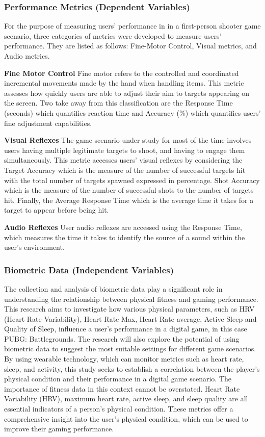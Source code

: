 \subsubsection{Performance Metrics (Dependent Variables)}
For the purpose of measuring users' performance in in a first-person shooter game scenario, three categories of metrics were
developed to measure users' performance. They are listed as follows: Fine-Motor Control, Visual metrics, and Audio metrics.

\textbf{Fine Motor Control} Fine motor refers to the controlled and coordinated incremental movements made by the hand
when handling items. This metric assesses how quickly users are able to adjust their aim to targets appearing on the screen.
Two take away from this classification are the Response Time (seconds) which quantifies reaction time and Accuracy (\%) which
quantifies users' fine adjustment capabilities.

\textbf{Visual Reflexes} The game scenario under study for most of the time involves users having multiple legitimate targets
to shoot, and having to engage them simultaneously. This metric accesses users' visual reflexes by considering the Target
Accuracy which is the measure of the number of successful targets hit with the total number of targets spawned expressed in
percentage. Shot Accuracy which is the measure of the number of successful shots to the number of targets hit. Finally, the
Average Response Time which is the average time it takes for a target to appear before being hit.

\textbf{Audio Reflexes} User audio reflexes are accessed using the Response Time, which measures the time it takes to
identify the source of a sound within the user's environment.

\subsubsection{Biometric Data (Independent Variables)}
The collection and analysis of biometric data play a significant role in understanding the relationship between physical fitness and
gaming performance. This research aims to investigate how various physical parameters, such as HRV (Heart Rate Variability), Heart
Rate Max, Heart Rate average, Active Sleep and Quality of Sleep, influence a user's performance in a digital game, in this case
PUBG: Battlegrounds. The research will also explore the potential of using biometric data to suggest the most suitable settings for
different game scenarios. By using wearable technology, which can monitor metrics such as heart rate, sleep, and activity, this study
seeks to establish a correlation between the player's physical condition and their performance in a digital game scenario. The
importance of fitness data in this context cannot be overstated. Heart Rate Variability (HRV), maximum heart rate, active sleep, and
sleep quality are all essential indicators of a person's physical condition. These metrics offer a comprehensive insight into the
user's physical condition, which can be used to improve their gaming performance.

